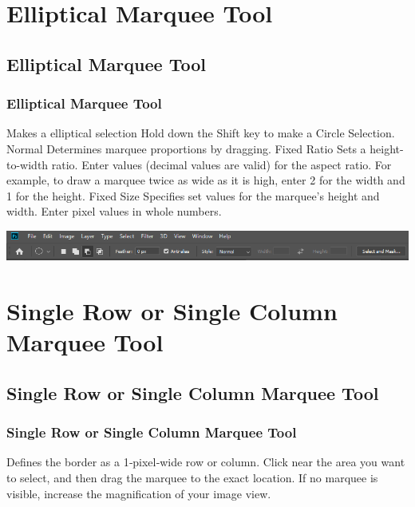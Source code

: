 \documentclass{beamer}
\begin{document}
\section{Elliptical Marquee Tool}
\subsection{Elliptical Marquee Tool}	
\begin{frame}
	\frametitle{Elliptical Marquee Tool}
	\begin{outline}
		\1 Makes a elliptical selection 
		\1 Hold down the Shift key to make a Circle Selection.
		\1 Normal
		\2 Determines marquee proportions by dragging.
		\1 Fixed Ratio
		\2 Sets a height-to-width ratio. Enter values (decimal values are valid) for the aspect ratio. 
		\3 For example, to draw a marquee twice as wide as it is high, enter 2 for the width and 1 for the height.
		\1 Fixed Size
		\2 Specifies set values for the marquee’s height and width. 
		\3 Enter pixel values in whole numbers.
	\end{outline}
	\begin{center}
		\includegraphics[width = 1.0\textwidth]{images/elliptical marquee.png}
	\end{center}
\end{frame}

	
\section{Single Row or Single Column Marquee Tool}
\subsection{Single Row or Single Column Marquee Tool}	
\begin{frame}
	\frametitle{Single Row or Single Column Marquee Tool}
	\begin{outline}
		\1 Defines the border as a 1‑pixel‑wide row or column.
		\1 Click near the area you want to select, and then drag the marquee to the exact location. 
		\2 If no marquee is visible, increase the magnification of your image view.
	\end{outline}

\end{frame}
\end{document}
